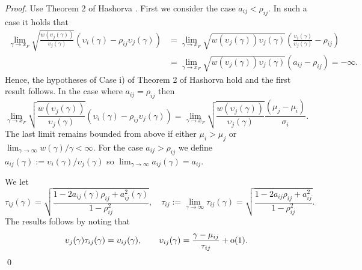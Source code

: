 \begin{subappendices}
\begin{proof}

Use Theorem 2 of Hashorva \cite{hashorva2007asymptotic}.
First we consider the case $a_{ij}<\rho_{ij}$.  In such a case it holds that
\begin{align*}
 \lim_{\gamma\to x_F} \sqrt{\frac{w(\upsilon_j(\gamma))}{\upsilon_j(\gamma)}}\left(\upsilon_i(\gamma)-\rho_{ij}\upsilon_j(\gamma)\right)
 &=\lim_{\gamma\to x_F} \sqrt{{w(\upsilon_j(\gamma))\upsilon_j(\gamma)}}\left(\frac{\upsilon_i(\gamma)}{\upsilon_j(\gamma)}-\rho_{ij}\right)\\
 &=\lim_{\gamma\to x_F} \sqrt{{w(\upsilon_j(\gamma))\upsilon_j(\gamma)}}\left(a_{ij}-\rho_{ij}\right)=-\infty.
\end{align*}
Hence, the hypotheses of Case i) of Theorem 2 of Hashorva \cite{hashorva2007asymptotic} hold and the first result follows.
In the case where $a_{ij}=\rho_{ij}$ then
\[
 \lim_{\gamma\to x_F} \sqrt{\frac{w(\upsilon_j(\gamma))}{\upsilon_j(\gamma)}}\left(\upsilon_i(\gamma)-\rho_{ij}\upsilon_j(\gamma)\right)
 =\lim_{\gamma\to x_F} \sqrt{\frac{w(\upsilon_j(\gamma))}{\upsilon_j(\gamma)}}\frac{(\mu_j-\mu_{i})}{\sigma_i}.
\]
The last limit remains bounded from above if either $\mu_i>\mu_j$ or $\lim_{\gamma\to\infty}w(\gamma)/\gamma<\infty$.
For the case $a_{ij}>\rho_{ij}$ we define
$a_{ij}(\gamma) := \upsilon_i(\gamma) / \upsilon_j(\gamma)$ so $\lim_{\gamma \to \infty} a_{ij}(\gamma)=a_{ij}$.

We let
 \[
   \tau_{ij}(\gamma) =
   \sqrt{ \frac{1-2a_{ij}(\gamma)\rho_{ij} + a_{ij}^2(\gamma)}{1-\rho^2_{ij}}},\quad
  \tau_{ij}:=\lim_{\gamma\to\infty}\tau_{ij}(\gamma)
    =\sqrt{ \frac{1-2a_{ij}\rho_{ij} + a_{ij}^2}{1-\rho^2_{ij}}}.
\]
The results follows by noting that
\[
 \upsilon_j(\gamma)\tau_{ij}(\gamma)= \upsilon_{ij}(\gamma),\qquad
 \upsilon_{ij}(\gamma)= \frac{\gamma-\mu_{ij}}{\tau_{ij}}+{\mathrm{o}}(1).
\]
\qed
\end{proof}
\end{subappendices}